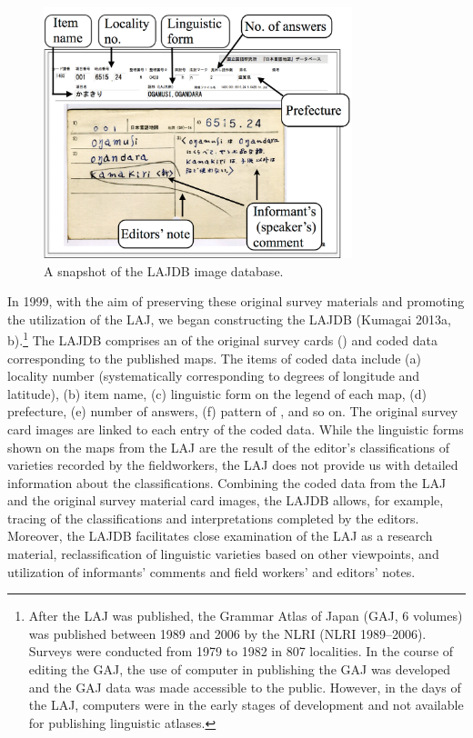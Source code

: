 \documentclass[output=paper]{LSP/langsci}
\begin{document}
\begin{figure}
\includegraphics[width=0.8\textwidth]{illustrations/kuma_fig02}
\caption{A snapshot of the LAJDB image database.}        
\label{fig:2}
\end{figure} 

In 1999, with the aim of preserving these original survey materials and promoting the utilization of the LAJ, we began constructing the LAJDB (Kumagai 2013a, b).\footnote{ After the LAJ was published, the Grammar Atlas of Japan (GAJ, 6 volumes) was published between 1989 and 2006 by the NLRI (NLRI 1989–2006). Surveys were conducted from 1979 to 1982 in 807 localities. In the course of editing the GAJ, the use of computer in publishing the GAJ was developed and the GAJ data was made accessible to the public. However, in the days of the LAJ, computers were in the early stages of development and not available for publishing linguistic atlases.} The LAJDB comprises an  of the original survey cards () and coded data corresponding to the published maps. The items of coded data include (a) locality number (systematically corresponding to degrees of longitude and latitude), (b) item name, (c) linguistic form on the legend of each map, (d) prefecture, (e) number of answers, (f) pattern of , and so on. The original survey card images are linked to each entry of the coded data. While the linguistic forms shown on the maps from the LAJ are the result of the editor’s classifications of varieties recorded by the fieldworkers, the LAJ does not provide us with detailed information about the classifications. Combining the coded data from the LAJ and the original survey material card images, the LAJDB allows, for example, tracing of the classifications and interpretations completed by the editors. Moreover, the LAJDB facilitates close examination of the LAJ as a research material, reclassification of linguistic varieties based on other viewpoints, and utilization of informants’ comments and field workers’ and editors’ notes.
\end{document}
